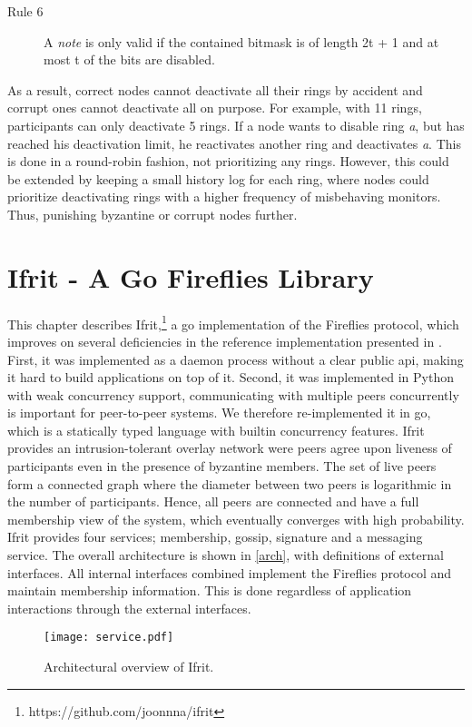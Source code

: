 \documentclass[USenglish]{uit-thesis}
\begin{document}
\begin{description}
\item[Rule 6] A \textit{note} is only valid if the contained bitmask is of length 2t + 1 and at most t of the bits are disabled.
\end{description}
As a result, correct nodes cannot deactivate all their rings by accident and corrupt ones cannot deactivate all on purpose.
For example, with 11 rings, participants can only deactivate 5 rings.
If a node wants to disable ring \textit{a}, but has reached his deactivation limit, he reactivates another ring and deactivates \textit{a}.
This is done in a round-robin fashion, not prioritizing any rings.
However, this could be extended by keeping a small history log for each ring, where nodes could prioritize deactivating rings with a higher frequency of misbehaving monitors.  
Thus, punishing byzantine or corrupt nodes further.


\chapter{Ifrit - A Go Fireflies Library}\label{chap:ifrit}
This chapter describes Ifrit,\footnote{https://github.com/joonnna/ifrit} a \gls{go} implementation of the Fireflies protocol, which improves on several deficiencies in the reference implementation presented in \cite{flies}.
First, it was implemented as a daemon process without a clear public \gls{api}, making it hard to build applications on top of it.
Second, it was implemented in Python with weak concurrency support, communicating with multiple peers concurrently is important for peer-to-peer systems. 
We therefore re-implemented it in \gls{go}, which is a statically typed language with builtin concurrency features.
Ifrit provides an intrusion-tolerant overlay network were peers agree upon liveness of participants even in the presence of byzantine members.
The set of live peers form a connected graph where the diameter between two peers is logarithmic in the number of participants.
Hence, all peers are connected and have a full membership view of the system, which eventually converges with high probability. 
Ifrit provides four services; membership, gossip, signature and a messaging service. 
The overall architecture is shown in \autoref{arch}, with definitions of external interfaces.
All internal interfaces combined implement the Fireflies protocol and maintain membership information. This is done regardless of application interactions through the external interfaces.
\begin{figure}[H]
	\centering
	\hspace*{-2cm}
	\texttt{[image: service.pdf]}
	\caption{Architectural overview of Ifrit.}
	\label{arch}
\end{figure}
\end{document}
